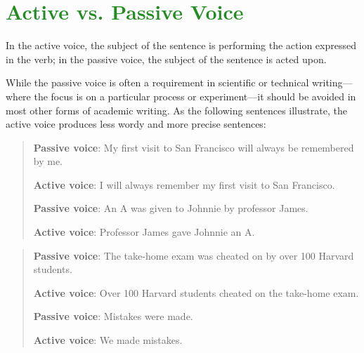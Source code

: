 
\section{\textcolor{ForestGreen}{Active vs. Passive Voice}}



In the active voice, the subject of the sentence is performing the action expressed in the verb; in the passive voice, the subject of the sentence is acted upon. 

While the passive voice is often a requirement in scientific or technical writing---where the focus is on a particular process or experiment---it should be avoided in most other forms of academic writing. As the following sentences illustrate, the active voice produces less wordy and more precise sentences:

\begin{quote}
 
\textbf{Passive voice}: My first visit to San Francisco will always be remembered by me.

\textbf{Active voice}: I will always remember my first visit to San Francisco.

\textbf{Passive voice}: 	An A was given to Johnnie by professor James.

\textbf{Active voice}: 	Professor James gave Johnnie an A.
\end{quote}

\begin{quote}
\textbf{Passive voice}: The take-home exam was cheated on by over 100 Harvard students.

\textbf{Active voice}: Over 100 Harvard students cheated on the take-home exam.

\textbf{Passive voice}: Mistakes were made.

\textbf{Active voice}: We made mistakes.

\end{quote}
